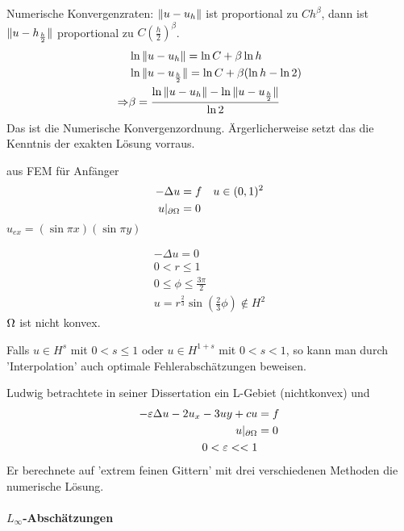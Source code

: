 Numerische Konvergenzraten: $\|u-u_h\|$ ist proportional zu $Ch^\beta$, dann ist $\|u-h_{\frac h2}\|$ proportional zu $C (\frac h 2)^\beta$.
\begin{align*}
  &\ln \|u-u_h\| = \ln C + \beta \ln h\\
  &\ln \|u-u_{\frac h 2}\| = \ln C + \beta (\ln h-\ln 2)\\
\Rightarrow &\beta = \frac {\ln\|u-u_h\|-\ln\|u-u_{\frac h2}\|}{\ln 2}
\end{align*}
Das ist die Numerische Konvergenzordnung. Ärgerlicherweise setzt das die Kenntnis der exakten Lösung vorraus.
\begin{beispiel} aus FEM für Anfänger
  \begin{align*}
    - \Delta u &= f \quad u \in (0,1)^2\\
u|_{\partial \Omega} &= 0
  \end{align*}
$u_{ex} =(\sin \pi x)(\sin \pi y) $
\end{beispiel}
\begin{beispiel}
  \begin{align*}
  - \Delta u = 0\\
0 < r \leq 1\\
0 \leq \phi \leq \frac {3 \pi}{2}\\
u = r^{\frac 2 3} \sin (\frac 2 3 \phi) \notin H^2  
  \end{align*}
$\Omega$ ist nicht konvex.
\end{beispiel}
\begin{bemerkung}
  Falls $u \in H^s$ mit $0<s \leq 1$ oder $u \in H^{1+s}$ mit $0< s<1$, so kann man durch 'Interpolation' auch optimale Fehlerabschätzungen beweisen.
\end{bemerkung}
Ludwig betrachtete in seiner Dissertation ein L-Gebiet (nichtkonvex) und
\begin{align*}
  - \varepsilon \Delta u - 2 u_x - 3 u y + cu &= f\\
u|_{\partial \Omega} &= 0\\
0< \varepsilon<<1&
\end{align*}
Er berechnete auf 'extrem feinen Gittern' mit drei verschiedenen Methoden die numerische Lösung.
\paragraph{$L_\infty$-Abschätzungen}
